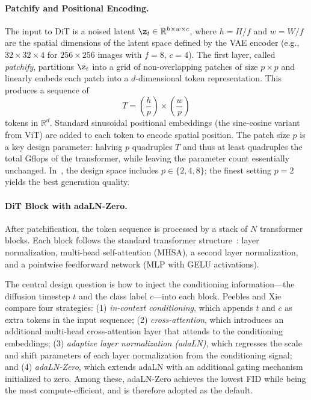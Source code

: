 \documentclass[../../book-main.tex]{subfiles}
\begin{document}
\paragraph{Patchify and Positional Encoding.}
The input to DiT is a noised latent $\z_t \in \mathbb{R}^{h \times w
\times c}$, where $h = H/f$ and $w = W/f$ are the spatial dimensions
of the latent space defined by the VAE encoder (e.g., $32 \times 32
\times 4$ for $256 \times 256$ images with $f = 8$, $c = 4$). The
first layer, called \emph{patchify}, partitions $\z_t$ into a grid of
non-overlapping patches of size $p \times p$ and linearly embeds each
patch into a $d$-dimensional token representation. This produces a sequence of
\begin{equation}
T = \left(\frac{h}{p}\right) \times \left(\frac{w}{p}\right)
\end{equation}
tokens in $\mathbb{R}^d$. Standard sinusoidal positional embeddings
(the sine-cosine variant from ViT) are added to each token to encode
spatial position. The patch size $p$ is a key design parameter:
halving $p$ quadruples $T$ and thus at least quadruples the total
Gflops of the transformer, while leaving the parameter count
essentially unchanged. In~\citep{peebles2023scalable}, the design
space includes $p \in \{2, 4, 8\}$; the finest setting $p = 2$ yields
the best generation quality.

\paragraph{DiT Block with adaLN-Zero.}
After patchification, the token sequence is processed by a stack of
$N$ transformer blocks. Each block follows the standard transformer
structure~\citep{vaswani2017attention}: layer normalization,
multi-head self-attention (MHSA), a second layer normalization, and a
pointwise feedforward network (MLP with GELU activations).

The central design question is how to inject the conditioning
information---the diffusion timestep $t$ and the class label
$c$---into each block. Peebles and Xie~\citep{peebles2023scalable}
compare four strategies: (1) \emph{in-context conditioning}, which
appends $t$ and $c$ as extra tokens in the input sequence; (2)
\emph{cross-attention}, which introduces an additional multi-head
cross-attention layer that attends to the conditioning embeddings;
(3) \emph{adaptive layer normalization (adaLN)}, which regresses the
scale and shift parameters of each layer normalization from the
conditioning signal; and (4) \emph{adaLN-Zero}, which extends adaLN
with an additional gating mechanism initialized to zero. Among these,
adaLN-Zero achieves the lowest FID while being the most
compute-efficient, and is therefore adopted as the default.
\end{document}
